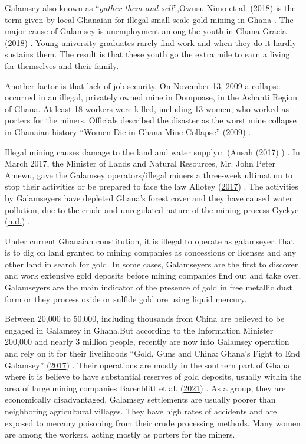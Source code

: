 \documentclass[
  onepage,
  openany]{scrbook}
\begin{document}
Galamsey also known as ``\emph{gather them and sell}'',Owusu-Nimo et al.
(\protect\hyperlink{ref-owusu-nimo2018}{2018}) is the term given by
local Ghanaian for illegal small-scale gold mining in Ghana . The major
cause of Galamsey is unemployment among the youth in Ghana Gracia
(\protect\hyperlink{ref-gracia2018}{2018}) . Young university graduates
rarely find work and when they do it hardly sustains them. The result is
that these youth go the extra mile to earn a living for themselves and
their family.

Another factor is that lack of job security. On November 13, 2009 a
collapse occurred in an illegal, privately owned mine in Dompoase, in
the Ashanti Region of Ghana. At least 18 workers were killed, including
13 women, who worked as porters for the miners. Officials described the
disaster as the worst mine collapse in Ghanaian history {``Women Die in
Ghana Mine Collapse''} (\protect\hyperlink{ref-womendi2009}{2009}) .

Illegal mining causes damage to the land and water supplym (Ansah
(\protect\hyperlink{ref-ansah2017}{2017}) ) . In March 2017, the
Minister of Lands and Natural Resources, Mr. John Peter Amewu, gave the
Galamsey operators/illegal miners a three-week ultimatum to stop their
activities or be prepared to face the law Allotey
(\protect\hyperlink{ref-allotey2017}{2017}) . The activities by
Galamseyers have depleted Ghana's forest cover and they have caused
water pollution, due to the crude and unregulated nature of the mining
process Gyekye (\protect\hyperlink{ref-gyekye}{n.d.}) .

Under current Ghanaian constitution, it is illegal to operate as
galamseyer.That is to dig on land granted to mining companies as
concessions or licenses and any other land in search for gold. In some
cases, Galamseyers are the first to discover and work extensive gold
deposits before mining companies find out and take over. Galamseyers are
the main indicator of the presence of gold in free metallic dust form or
they process oxide or sulfide gold ore using liquid mercury.

Between 20,000 to 50,000, including thousands from China are believed to
be engaged in Galamsey in Ghana.But according to the Information
Minister 200,000 and nearly 3 million people, recently are now into
Galamsey operation and rely on it for their livelihoods {``Gold, Guns
and China: Ghana's Fight to End Galamsey''}
(\protect\hyperlink{ref-goldgu2017}{2017}) . Their operations are mostly
in the southern part of Ghana where it is believe to have substantial
reserves of gold deposits, usually within the area of large mining
companies Barenblitt et al.
(\protect\hyperlink{ref-barenblitt2021}{2021}) . As a group, they are
economically disadvantaged. Galamsey settlements are usually poorer than
neighboring agricultural villages. They have high rates of accidents and
are exposed to mercury poisoning from their crude processing methods.
Many women are among the workers, acting mostly as porters for the
miners.
\end{document}
